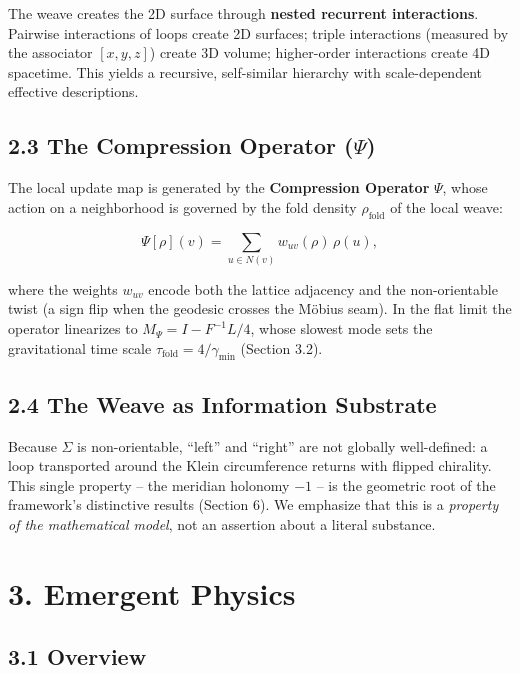 \documentclass[
  11pt,
]{article}
\begin{document}
The weave creates the 2D surface through \textbf{nested recurrent
interactions}. Pairwise interactions of loops create 2D surfaces; triple
interactions (measured by the associator \([x, y, z]\)) create 3D
volume; higher-order interactions create 4D spacetime. This yields a
recursive, self-similar hierarchy with scale-dependent effective
descriptions.

\subsection{\texorpdfstring{2.3 The Compression Operator
(\(\Psi\))}{2.3 The Compression Operator (\textbackslash Psi)}}\label{the-compression-operator-psi}

The local update map is generated by the \textbf{Compression Operator}
\(\Psi\), whose action on a neighborhood is governed by the fold density
\(\rho_{\text{fold}}\) of the local weave:

\[\Psi[\rho](v) = \sum_{u \in N(v)} w_{uv}(\rho)\, \rho(u),\]

where the weights \(w_{uv}\) encode both the lattice adjacency and the
non-orientable twist (a sign flip when the geodesic crosses the Möbius
seam). In the flat limit the operator linearizes to
\(M_\Psi = I - F^{-1}L/4\), whose slowest mode sets the gravitational
time scale \(\tau_{\text{fold}} = 4/\gamma_{\min}\) (Section 3.2).

\subsection{2.4 The Weave as Information
Substrate}\label{the-weave-as-information-substrate}

Because \(\Sigma\) is non-orientable, ``left'' and ``right'' are not
globally well-defined: a loop transported around the Klein circumference
returns with flipped chirality. This single property -- the meridian
holonomy \(-1\) -- is the geometric root of the framework's distinctive
results (Section 6). We emphasize that this is a \emph{property of the
mathematical model}, not an assertion about a literal substance.

\section{3. Emergent Physics}\label{emergent-physics}

\subsection{3.1 Overview}\label{overview}
\end{document}
